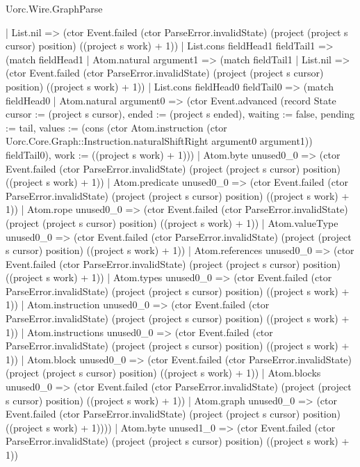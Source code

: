 \begin{lexlean}{Uorc.Wire.GraphParse}
\begin{semanticmodule}
{        | List.nil => (ctor Event.failed (ctor ParseError.invalidState) (project (project s cursor) position) ((project s work) + 1))
        | List.cons fieldHead1 fieldTail1 => (match fieldHead1
          | Atom.natural argument1 => (match fieldTail1
            | List.nil => (ctor Event.failed (ctor ParseError.invalidState) (project (project s cursor) position) ((project s work) + 1))
            | List.cons fieldHead0 fieldTail0 => (match fieldHead0
              | Atom.natural argument0 => (ctor Event.advanced (record State {cursor := (project s cursor), ended := (project s ended), waiting := false, pending := tail, values := (cons (ctor Atom.instruction (ctor Uorc.Core.Graph::Instruction.naturalShiftRight argument0 argument1)) fieldTail0), work := ((project s work) + 1)}))
              | Atom.byte unused0_0 => (ctor Event.failed (ctor ParseError.invalidState) (project (project s cursor) position) ((project s work) + 1))
              | Atom.predicate unused0_0 => (ctor Event.failed (ctor ParseError.invalidState) (project (project s cursor) position) ((project s work) + 1))
              | Atom.rope unused0_0 => (ctor Event.failed (ctor ParseError.invalidState) (project (project s cursor) position) ((project s work) + 1))
              | Atom.valueType unused0_0 => (ctor Event.failed (ctor ParseError.invalidState) (project (project s cursor) position) ((project s work) + 1))
              | Atom.references unused0_0 => (ctor Event.failed (ctor ParseError.invalidState) (project (project s cursor) position) ((project s work) + 1))
              | Atom.types unused0_0 => (ctor Event.failed (ctor ParseError.invalidState) (project (project s cursor) position) ((project s work) + 1))
              | Atom.instruction unused0_0 => (ctor Event.failed (ctor ParseError.invalidState) (project (project s cursor) position) ((project s work) + 1))
              | Atom.instructions unused0_0 => (ctor Event.failed (ctor ParseError.invalidState) (project (project s cursor) position) ((project s work) + 1))
              | Atom.block unused0_0 => (ctor Event.failed (ctor ParseError.invalidState) (project (project s cursor) position) ((project s work) + 1))
              | Atom.blocks unused0_0 => (ctor Event.failed (ctor ParseError.invalidState) (project (project s cursor) position) ((project s work) + 1))
              | Atom.graph unused0_0 => (ctor Event.failed (ctor ParseError.invalidState) (project (project s cursor) position) ((project s work) + 1))))
          | Atom.byte unused1_0 => (ctor Event.failed (ctor ParseError.invalidState) (project (project s cursor) position) ((project s work) + 1))
}
\end{semanticmodule}
\end{lexlean}
